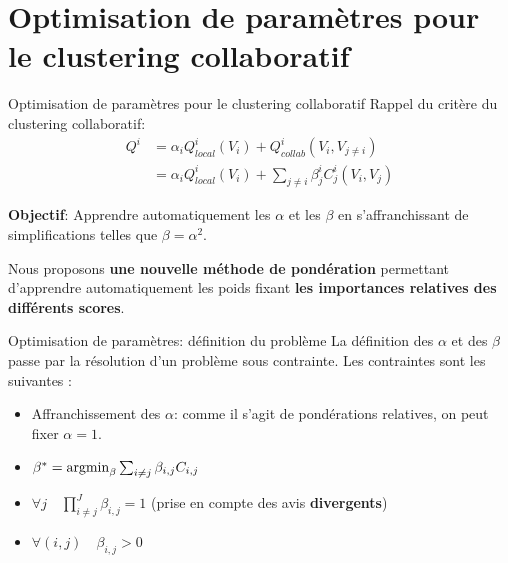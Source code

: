 \documentclass[hyperref={pdfpagelabels=false}]{beamer}
\begin{document}
    \section{Optimisation de paramètres pour le clustering collaboratif}

    \begin{frame}{Optimisation de paramètres pour le clustering collaboratif}
        Rappel du critère du clustering collaboratif:
        \begin{align*}
            Q^i &= \alpha_i Q^i_{local}(V_i) + Q^i_{collab}(V_i, 
            V_{j\neq i})\\
            &= \alpha_i Q^i_{local}(V_i) + \sum_{j\neq i} \beta^i_j 
            C_j^i(V_i, V_j)
        \end{align*}

        \textbf{Objectif}: Apprendre automatiquement les $\alpha$ et les
        $\beta$ en s'affranchissant de simplifications telles que $\beta =
        \alpha^2$.

        Nous proposons \textbf{une nouvelle méthode de pondération} permettant 
        d'apprendre automatiquement les poids fixant \textbf{les importances 
        relatives des différents scores}.\\
    \end{frame}

    \begin{frame}{Optimisation de paramètres: définition du problème}
        La définition des $\alpha$ et des $\beta$ passe par la résolution
        d'un problème sous contrainte. Les contraintes sont les suivantes :

        \begin{itemize}
            \item<2->{Affranchissement des $\alpha$: comme il s'agit de 
                pondérations relatives, on peut fixer $\alpha=1$.}
            \item<3-> $\beta^* =  
                \operatornamewithlimits{argmin}_{\beta}  \sum_{i \neq j}
        \beta_{i,j}  C _{i,j} $
            \item<4-> $\forall j \quad \prod_{i \neq j}^J \beta_{i,j} = 
                1$ (prise en compte des avis \textbf{divergents})
            \item<5-> $\forall (i,j) \quad \beta_{i,j} >0$
        \end{itemize}

    \end{frame}
\end{document}
